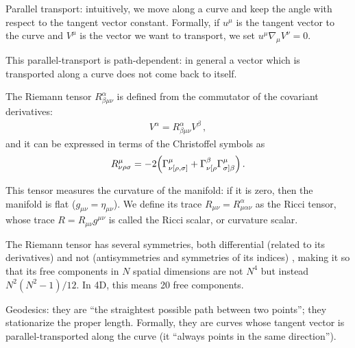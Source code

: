 \documentclass[main.tex]{subfiles}
\begin{document}
Parallel transport: intuitively, we move along a curve and keep the angle with respect to the tangent vector constant. 
Formally, if \(u^{\mu }\) is the tangent vector to the curve and \(V^{\mu }\) is the vector we want to transport, we set \(u^{\mu } \nabla_{\mu } V^{\nu }= 0\). 

This parallel-transport is path-dependent: in general a vector which is transported along a curve does not come back to itself.

The Riemann tensor \(R^{\alpha}_{\beta \mu \nu }\) is defined from the commutator of the covariant derivatives:
%
\begin{align}
[\nabla_{\mu }, \nabla_{\nu }] V^{\alpha } = R^{\alpha }_{\beta \mu \nu } V^{\beta }
\,,
\end{align}
%
and it can be expressed in terms of the Christoffel symbols as 
%
\begin{align}
R^{\mu }_{\nu \rho \sigma } = -2 \qty(\Gamma^{\mu }_{\nu [\rho , \sigma ]} + \Gamma^{\beta }_{\nu [\rho } \Gamma^{\mu }_{\sigma ] \beta })
\,.
\end{align}

This tensor measures the curvature of the manifold: if it is zero, then the manifold is flat (\(g_{\mu \nu } = \eta_{\mu \nu }\)).
We define its trace \(R_{\mu \nu } = R^{\alpha }_{\mu \alpha \nu }\) as the Ricci tensor, whose trace \(R = R_{\mu \nu } g^{\mu \nu }\) is called the Ricci scalar, or curvature scalar.

The Riemann tensor has several symmetries, both differential (related to its derivatives) and not (antisymmetries and symmetries of its indices) \cite[eqs.\ 7.14-7.18]{hobsonGeneralRelativityIntroduction2006a}, making it so that its free components in \(N\) spatial dimensions are not \(N^{4}\) but instead \(N^2 (N^2 -1 )  /12\). In 4D, this means 20 free components.

Geodesics: they are ``the straightest possible path between two points''; they stationarize the proper length.
Formally, they are curves whose tangent vector is parallel-transported along the curve (it ``always points in the same direction''). 


\end{document}

